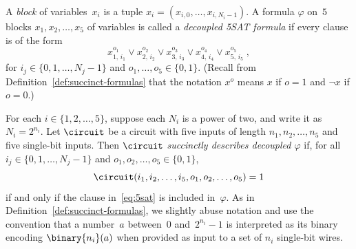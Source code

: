 \begin{definition}
  A \emph{block} of variables~$x_i$ is a tuple $x_i = (x_{i,0}, \ldots, x_{i,
    N_i-1})$.
  A formula $\varphi$ on~$5$ blocks $x_1, x_2, \ldots, x_5$ of variables is
  called a \emph{decoupled 5SAT formula} if every clause is of the form
  \begin{equation}\label{eq:5sat}
    x_{1,\, i_1}^{o_1}
    \lor x_{2,\, i_2}^{o_2}
    \lor x_{3,\, i_3}^{o_3}
    \lor x_{4,\, i_4}^{o_4}
    \lor x_{5,\, i_5}^{o_5}\;,
  \end{equation}
  for $i_j \in \{0, 1, \ldots, N_j-1\}$ and $o_1, \ldots, o_5 \in \{0, 1\}$.
  (Recall from Definition~\ref{def:succinct-formulas} that the notation $x^{o}$
  means $x$ if $o = 1$ and $\neg x$ if $o = 0$.)

  For each $i\in\{1, 2, \ldots, 5\}$, suppose each $N_i$ is a power of two, and write
  it as $N_i = 2^{n_i}$.
  Let $\circuit$ be a circuit with five inputs of length $n_1, n_2, \ldots, n_5$ and
  five single-bit inputs.
  Then $\circuit$ \emph{succinctly describes decoupled $\varphi$} if, for all
  $i_j \in \{0, 1, \ldots, N_j-1\}$ and $o_1, o_2, \ldots, o_5 \in \{0, 1\}$,
  \begin{equation}\label{eq:put-in-numbers}
    \circuit(i_1, i_2, \ldots, i_5,
    o_1, o_2, \ldots, o_5) = 1
  \end{equation}
  if and only if the clause in~\eqref{eq:5sat} is included in~$\varphi$.
  As in Definition~\ref{def:succinct-formulas}, we slightly abuse notation and
  use the convention that a number~$a$ between~$0$ and~$2^{n_i}-1$ is
  interpreted as its binary encoding $\binary{n_i}(a)$ when provided as input to
  a set of $n_i$ single-bit wires.
\end{definition}

